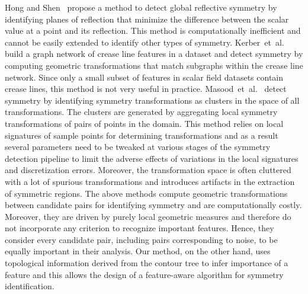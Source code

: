 \documentclass[review,journal]{vgtc}         %
\begin{document}
Hong and Shen~\cite{HongS08} propose a method to detect global reflective symmetry by identifying planes
of reflection that minimize the difference between the scalar value at a point and its
reflection. This method is computationally inefficient and cannot be easily extended to identify 
other types of symmetry. Kerber~et~al.~\cite{kerbWKS11} build a graph network of crease line features in a dataset
and detect symmetry by computing geometric transformations that match subgraphs within the crease line network.
Since only a small subset of features in scalar field datasets contain crease lines, 
this method is not very useful in practice. Masood~et~al.~\cite{MasoodTN13} detect
symmetry by identifying symmetry transformations as clusters in the space of all transformations.
The clusters are generated by aggregating local symmetry transformations of pairs of points in the 
domain. This method relies on local signatures of sample points for determining 
transformations and as a result several parameters need to be tweaked at various stages of 
the symmetry detection pipeline to limit the adverse effects of variations in the local signatures 
and discretization errors.  Moreover, the transformation space is often cluttered with a lot of 
spurious transformations and introduces artifacts in the extraction of symmetric regions.
The above methods compute geometric transformations between candidate pairs for identifying
symmetry and are computationally costly. Moreover, they are driven by purely local geometric 
measures and therefore do not incorporate any criterion to recognize important features. Hence, they consider every 
candidate pair, including pairs corresponding to noise, to be equally important in their analysis. 
Our method, on the other hand, uses topological information derived from the contour tree to infer 
importance of a feature and this allows the design of a feature-aware algorithm for symmetry identification. 
\end{document}
